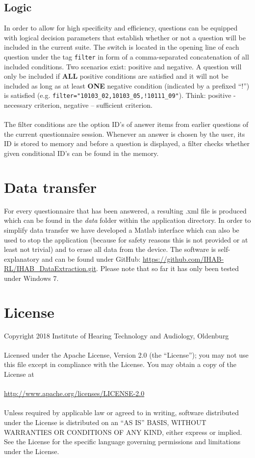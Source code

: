 \documentclass[11pt,a4paper,titlepage]{article}
\newcommand{\Institute}{Institute of Hearing Technology and Audiology, Oldenburg}
\begin{document}
\subsection{Logic}\label{sub:logic}

In order to allow for high specificity and efficiency, questions can be equipped with logical decision parameters that establish whether or not a question will be included in the current suite. The switch is located in the opening line of each question under the tag \texttt{filter} in form of a comma-separated concatenation of all included conditions. Two scenarios exist: positive and negative. A question will only be included if \textbf{ALL} positive conditions are satisfied and it will not be included as long as at least \textbf{ONE} negative condition (indicated by a prefixed ``!'') is satisfied (e.g. \texttt{filter="10103\_02,10103\_05,!10111\_09"}). Think: positive - necessary criterion, negative -- sufficient criterion.\\
\\
The filter conditions are the option ID's of answer items from earlier questions of the current questionnaire session. Whenever an answer is chosen by the user, its ID is stored to memory and before a question is displayed, a filter checks whether given conditional ID's can be found in the memory.\\

\section{Data transfer}

For every questionnaire that has been answered, a resulting .xml file is produced which can be found in the \textit{data} folder within the application directory. In order to simplify data transfer we have developed a Matlab interface which can also be used to stop the application (because for safety reasons this is not provided or at least not trivial) and to erase all data from the device. The software is self-explanatory and can be found under GitHub: \url{https://github.com/IHAB-RL/IHAB_DataExtraction.git}. Please note that so far it has only been tested under Windows 7.

\clearpage

\section{License}

 Copyright 2018 \Institute\\
\\
   Licensed under the Apache License, Version 2.0 (the ``License'');
   you may not use this file except in compliance with the License.
   You may obtain a copy of the License at\\
\\
     \url{http://www.apache.org/licenses/LICENSE-2.0}\\
\\
   Unless required by applicable law or agreed to in writing, software
   distributed under the License is distributed on an ``AS IS'' BASIS,
   WITHOUT WARRANTIES OR CONDITIONS OF ANY KIND, either express or implied.
   See the License for the specific language governing permissions and
   limitations under the License.
\end{document}
